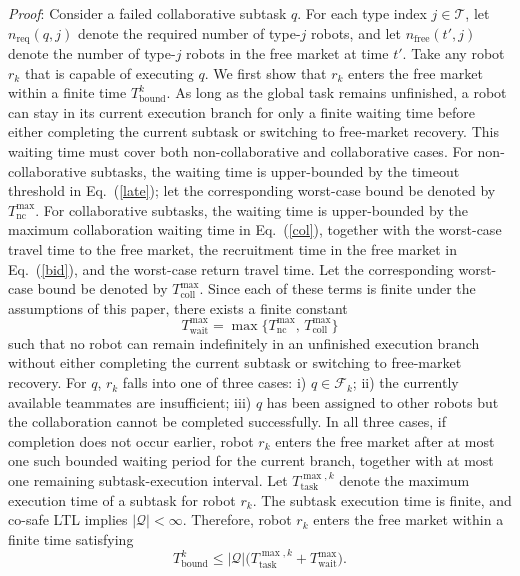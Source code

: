 \documentclass[lettersize,journal]{IEEEtran}
\begin{document}
\textit{Proof}: Consider a failed collaborative subtask $q$. For each type index $j \in \mathcal{T}$, let $n_{\mathrm{req}}(q,j)$ denote the required number of type-$j$ robots, and let $n_{\mathrm{free}}(t',j)$ denote the number of type-$j$ robots in the free market at time $t'$. Take any robot $r_k$ that is capable of executing $q$. We first show that $r_k$ enters the free market within a finite time $T_{\mathrm{bound}}^k$.
As long as the global task remains unfinished, a robot can stay in its current execution branch for only a finite waiting time before either completing the current subtask or switching to free-market recovery. This waiting time must cover both non-collaborative and collaborative cases. For non-collaborative subtasks, the waiting time is upper-bounded by the timeout threshold in Eq.~(\ref{late}); let the corresponding worst-case bound be denoted by $T_{\mathrm{nc}}^{\max}$. For collaborative subtasks, the waiting time is upper-bounded by the maximum collaboration waiting time in Eq.~(\ref{col}), together with the worst-case travel time to the free market, the recruitment time in the free market in Eq.~(\ref{bid}), and the worst-case return travel time. Let the corresponding worst-case bound be denoted by $T_{\mathrm{coll}}^{\max}$. Since each of these terms is finite under the assumptions of this paper, there exists a finite constant
\[
T_{\mathrm{wait}}^{\max}=\max\{T_{\mathrm{nc}}^{\max},\,T_{\mathrm{coll}}^{\max}\}
\]
such that no robot can remain indefinitely in an unfinished execution branch without either completing the current subtask or switching to free-market recovery.
For $q$, $r_k$ falls into one of three cases: i) $q \in \mathcal{F}_k$; ii) the currently available teammates are insufficient; iii) $q$ has been assigned to other robots but the collaboration cannot be completed successfully. In all three cases, if completion does not occur earlier, robot $r_k$ enters the free market after at most one such bounded waiting period for the current branch, together with at most one remaining subtask-execution interval. Let $T_{\mathrm{task}}^{\max,k}$ denote the maximum execution time of a subtask for robot $r_k$. The subtask execution time is finite, and co-safe LTL implies $|\mathcal{Q}|<\infty$. Therefore, robot $r_k$ enters the free market within a finite time satisfying
\begin{equation*}
T_{\mathrm{bound}}^k \le |\mathcal{Q}|\bigl(T_{\mathrm{task}}^{\max,k}+T_{\mathrm{wait}}^{\max}\bigr).
\end{equation*}
\end{document}
